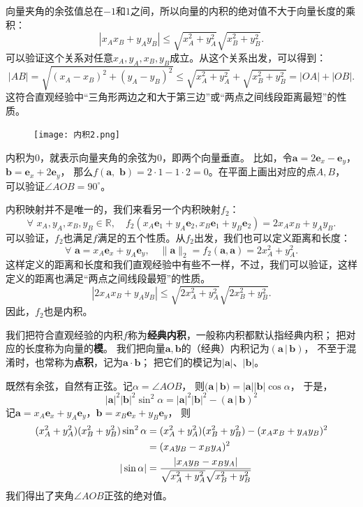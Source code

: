 \documentclass[12pt,UTF8]{ctexbook}
\begin{document}
向量夹角的余弦值总在$-1$和$1$之间，所以向量的内积的绝对值不大于向量长度的乘积：
$$ |x_Ax_B + y_Ay_B| \leqslant \sqrt{x_A^2 + y_A^2} \sqrt{x_B^2 + y_B^2}.$$
可以验证这个关系对任意$x_A, y_A, x_B, y_B$成立。从这个关系出发，可以得到：
$$ |AB| = \sqrt{(x_A - x_B)^2 + (y_A - y_B)^2} \leqslant \sqrt{x_A^2 + y_A^2} + \sqrt{x_B^2 + y_B^2} = |OA| + |OB|.$$
这符合直观经验中“三角形两边之和大于第三边”或“两点之间线段距离最短”的性质。

\begin{figure} 
    \vspace{-16pt}
    \flushright
    \texttt{[image: 内积2.png]}
\end{figure}

内积为$0$，就表示向量夹角的余弦为$0$，即两个向量垂直。
比如，令$\mathbf{a} = 2\mathbf{e}_x - \mathbf{e}_y$，$\mathbf{b} = \mathbf{e}_x + 2\mathbf{e}_y$，
那么$f(\mathbf{a}, \,\, \mathbf{b}) = 2\cdot 1 - 1\cdot 2 = 0$。在平面上画出对应的点$A,B$，
可以验证$\angle AOB = 90^\circ$。

内积映射并不是唯一的，我们来看另一个内积映射$f_2$：
$$ \forall \,\, x_A, y_A, x_B, y_B \in \mathbb{R}, \quad f_2(x_A\mathbf{e}_1 + y_A\mathbf{e}_2, x_B\mathbf{e}_1 + y_B\mathbf{e}_2) = 2x_Ax_B + y_A y_B.$$
可以验证，$f_2$也满足$f$满足的五个性质。从$f_2$出发，我们也可以定义距离和长度：
$$ \forall \,\, \mathbf{a} = x_A\mathbf{e}_x + y_A\mathbf{e}_y, \quad \| \mathbf{a} \|_2 = f_2(\mathbf{a}, \mathbf{a}) = 2x_A^2 + y_A^2. $$
这样定义的距离和长度和我们直观经验中有些不一样，不过，我们可以验证，这样定义的距离也满足“两点之间线段最短”的性质。
$$ |2x_Ax_B + y_Ay_B| \leqslant \sqrt{2x_A^2 + y_A^2} \sqrt{2x_B^2 + y_B^2}.$$
因此，$f_2$也是内积。

我们把符合直观经验的内积$f$称为\textbf{经典内积}，一般称内积都默认指经典内积；
把对应的长度称为向量的\textbf{模}。
我们把向量$\mathbf{a}, \mathbf{b}$的（经典）内积记为$(\mathbf{a}\, | \, \mathbf{b})$，
不至于混淆时，也常称为\textbf{点积}，记为$\mathbf{a} \cdot \mathbf{b}$；
把它们的模记为$|\mathbf{a}|$、$|\mathbf{b}|$。

既然有余弦，自然有正弦。记$\alpha = \angle AOB$，
则$(\mathbf{a}\, | \, \mathbf{b}) = |\mathbf{a}||\mathbf{b}| \cos \alpha$，
于是，
$$ |\mathbf{a}|^2|\mathbf{b}|^2 \sin^2 \alpha = |\mathbf{a}|^2|\mathbf{b}|^2 - (\mathbf{a}\, | \, \mathbf{b})^2 $$
记$\mathbf{a} = x_A\mathbf{e}_x + y_A\mathbf{e}_y$，$\mathbf{b} = x_B\mathbf{e}_x + y_B\mathbf{e}_y$，
则
\begin{align}
    (x_A^2 + y_A^2)(x_B^2 + y_B^2) \sin^2 \alpha &= (x_A^2 + y_A^2)(x_B^2 + y_B^2) - (x_Ax_B + y_Ay_B)^2 \notag \\
    &= (x_Ay_B - x_By_A)^2 \notag \\
    |\sin \alpha| &= \frac{|x_Ay_B - x_By_A|}{\sqrt{x_A^2 + y_A^2} \sqrt{x_B^2 + y_B^2}} \notag
\end{align}
我们得出了夹角$\angle AOB$正弦的绝对值。
\end{document}
